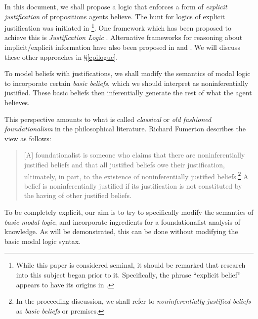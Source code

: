 \documentclass[11pt,titlepage]{report}
\numberwithin{equation}{subsection}
\begin{document}
In this document, we shall propose a logic that enforces a form of
\emph{explicit justification} of propositions agents believe. 
The hunt for logics of
explicit justification was initiated in
\citet{van_benthem_reflectionsepistemic_1991}\footnote{While this
  paper is considered seminal, it should be remarked that research
  into this subject began prior to it.  Specifically, the
  phrase ``explicit belief'' appears to have its origins in
  \citep{levesque_logic_1984}.}. One framework which has been proposed
to achieve this is \emph{Justification Logic}
\citep{artemov_introducing_2005,artemov_justification_2007,fitting_logic_2004,fitting_logic_2005}.
Alternative frameworks for reasoning about implicit/explicit
information have also been proposed in \citet{van_benthem_inference_2009} and
\citet{velzquez-quesada_inference_2009}.  We will discuss these other
approaches in \S\ref{epilogue}.

To model beliefs with justifications, we shall modify the semantics of
modal logic to incorporate  certain \emph{basic beliefs}, which we
should interpret as noninferentially  justified.  
These basic beliefs then inferentially generate the rest  of what the
agent believes.

This perspective amounts to what is called 
\emph{classical} or \emph{old fashioned foundationalism} in the philosophical literature.  
Richard Fumerton describes the view as follows:

\begin{quote}
[A] foundationalist is someone who claims that there are 
noninferentially justified beliefs and that all justified 
beliefs owe their justification, ultimately, in part, to the 
existence of noninferentially justified beliefs.\footnote{In the
  proceeding discussion, we shall refer 
 to \emph{noninferentially justified beliefs} as \emph{basic
   beliefs} or premises.}  
A belief is  noninferentially justified if its justification is not constituted 
by the having of other justified beliefs. \citep[pg. 3]{depaul_resurrecting_2001}
\end{quote}

To be completely explicit, our aim is to try to specifically modify
the semantics of \emph{basic modal logic}, 
and incorporate ingredients for a foundationalist analysis of knowledge.  As
will be demonstrated, this can be done without modifying the basic modal
logic syntax. 
\end{document}
